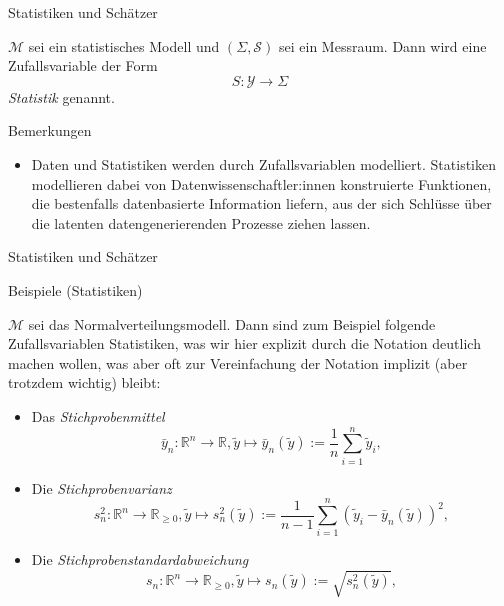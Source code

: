 \documentclass[
  8pt,
  ignorenonframetext,
]{beamer}
\providecommand{\tightlist}{%
  \setlength{\itemsep}{0pt}\setlength{\parskip}{0pt}}
\begin{document}
\begin{frame}{Statistiken und Schätzer}
\protect\hypertarget{statistiken-und-schuxe4tzer}{}
\small
\begin{definition}[Statistik]
\justifying
$\mathcal{M}$ sei ein statistisches Modell und $(\Sigma,\mathcal{S})$ sei ein Messraum.
Dann wird eine Zufallsvariable der Form
\begin{equation}
S : \mathcal{Y} \to \Sigma
\end{equation}
\textit{Statistik} genannt.
\end{definition}

Bemerkungen

\begin{itemize}
\tightlist
\item
  \justifying Daten und Statistiken werden durch Zufallsvariablen
  modelliert. Statistiken modellieren dabei von
  Datenwissenschaftler:innen konstruierte Funktionen, die bestenfalls
  datenbasierte Information liefern, aus der sich Schlüsse über die
  latenten datengenerierenden Prozesse ziehen lassen.
\end{itemize}
\end{frame}

\begin{frame}{Statistiken und Schätzer}
\protect\hypertarget{statistiken-und-schuxe4tzer-1}{}
\small

Beispiele (Statistiken)

\small

\(\mathcal{M}\) sei das Normalverteilungsmodell. Dann sind zum Beispiel
folgende Zufallsvariablen Statistiken, was wir hier explizit durch die
Notation deutlich machen wollen, was aber oft zur Vereinfachung der
Notation implizit (aber trotzdem wichtig) bleibt:

\begin{itemize}
\tightlist
\item
  Das \textit{Stichprobenmittel} \begin{equation}
  \bar{y}_n : \mathbb{R}^n \to \mathbb{R},
  \tilde{y} \mapsto \bar{y}_n(\tilde{y}) := \frac{1}{n}\sum_{i=1}^n \tilde{y}_i,
  \end{equation}
\item
  Die \textit{Stichprobenvarianz} \begin{equation}
  s^2_n  : \mathbb{R}^n \to \mathbb{R}_{\ge 0},
  \tilde{y} \mapsto s^2_n(\tilde{y}) := \frac{1}{n-1}\sum_{i=1}^n (\tilde{y}_i - \bar{y}_n(\tilde{y}))^2,
  \end{equation}
\item
  Die \textit{Stichprobenstandardabweichung} \begin{equation}
  s_n  : \mathbb{R}^n \to \mathbb{R}_{\ge 0},
  \tilde{y} \mapsto s_n(\tilde{y}) := \sqrt{s_n^2(\tilde{y})},
  \end{equation}
\end{itemize}
\end{frame}
\end{document}
